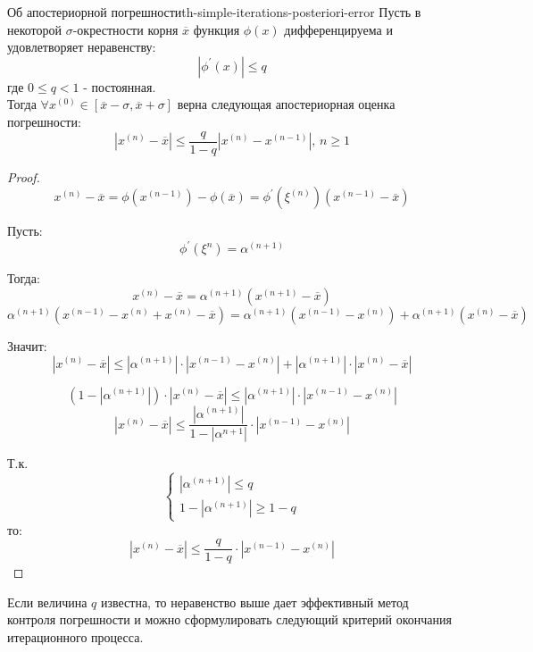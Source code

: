 \documentclass[14pt]{extarticle}
\begin{document}
        \begin{theorem}{Об апостериорной погрешности}{th-simple-iterations-posteriori-error}
            Пусть в некоторой $\sigma$-окрестности корня $\overline{x}$ функция $\phi(x)$ дифференцируема и удовлетворяет неравенству:
            $$|\phi^{'}(x)| \leq q$$
            где $0 \leq q < 1$ - постоянная.\\

            Тогда $\forall x^{(0)} \in [\overline{x} - \sigma, \overline{x} + \sigma]$ верна следующая апостериорная оценка погрешности:
            $$|x^{(n)} - \overline{x}| \leq \frac{q}{1 - q} |x^{(n)} - x^{(n - 1)}| \text{, } n \geq 1$$

            \begin{proof}
                $$x^{(n)} - \overline{x} = \phi(x^{(n - 1)}) - \phi(\overline{x}) = \phi^{'}(\xi^{(n)})(x^{(n - 1)} - \overline{x})$$

                Пусть: 
                $$\phi^{'}(\xi^{n}) = \alpha^{(n+1)}$$

                Тогда:
                $$x^{(n)} - \overline{x} = \alpha^{(n+1)}(x^{(n+1)} - \overline{x})$$
                $$\alpha^{(n + 1)}(x^{(n - 1)} - x^{(n)} + x^{(n)} - \overline{x}) = \alpha^{(n + 1)}(x^{(n - 1)} - x^{(n)}) + \alpha^{(n + 1)}(x^{(n)} - \overline{x})$$
                
                Значит:
                $$|x^{(n)} - \overline{x}| \leq |\alpha^{(n + 1)}| \cdot |x^{(n - 1)} - x^{(n)}| + |\alpha^{(n + 1)}| \cdot |x^{(n)} - \overline{x}|$$

                $$(1 - |\alpha^{(n + 1)}|) \cdot |x^{(n)} - \overline{x}| \leq |\alpha^{(n + 1)}| \cdot |x^{(n - 1)} - x^{(n)}|$$
                $$|x^{(n)} - \overline{x}| \leq \frac{|\alpha^{(n + 1)}|}{1 - |\alpha^{n + 1}|} \cdot |x^{(n - 1)} - x^{(n)}|$$

                Т.к. $$\begin{cases} 
                       |\alpha^{(n + 1)}| \leq q \\
                       1 - |\alpha^{(n + 1)}| \geq 1 - q
                       \end{cases}$$ то:
                $$|x^{(n)} - \overline{x}| \leq \frac{q}{1-q} \cdot |x^{(n - 1)} - x^{(n)}|$$
            \end{proof}
        \end{theorem}

        Если величина $q$ известна, то неравенство выше дает эффективный метод контроля погрешности и можно сформулировать следующий критерий окончания итерационного процесса.
\end{document}
